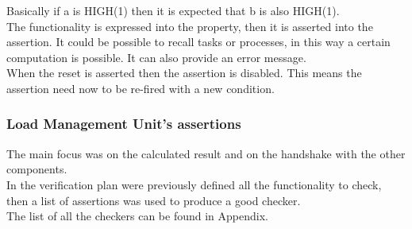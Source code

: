 Basically if a is HIGH(1) then it is expected that b is also HIGH(1).\\

The functionality is expressed into the property, then it is asserted into the assertion. It could be possible to recall tasks or processes, in this way a certain computation is possible.
It can also provide an error message.\\
When the reset is asserted then the assertion is disabled. This means the assertion need now to be re-fired with a new condition.\\

\subsubsection{Load Management Unit's assertions}
The main focus was on the calculated result and on the handshake with the other components.\\

In the verification plan were previously defined all the functionality to check, then a list of assertions was used to produce a good checker.\\

The list of all the checkers can be found in Appendix.\\

